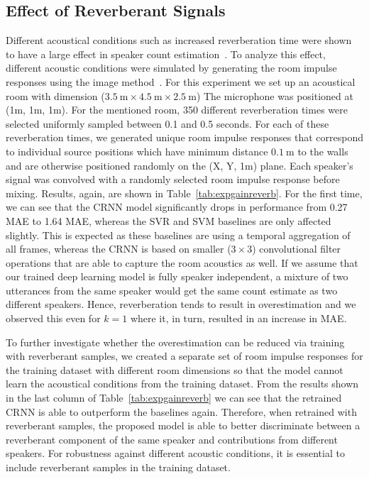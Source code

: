 \subsection{Effect of Reverberant Signals}%
\label{ssec:exp_reverb}
Different acoustical conditions such as increased reverberation time were shown to have a large effect in speaker count estimation~\cite{Pasha17_reverb}.
To analyze this effect, different acoustic conditions were simulated by generating the room impulse responses using the image method~\cite{allen79, habets16}.
For this experiment we set up an acoustical room with dimension ($3.5~\mbox{m} \times 4.5~\mbox{m} \times 2.5~\mbox{m}$)
The microphone was positioned at (1m, 1m, 1m).
For the mentioned room, 350 different reverberation times were selected uniformly sampled between 0.1 and 0.5 seconds.
For each of these reverberation times, we generated unique room impulse responses that correspond to individual source positions which have minimum distance $0.1~\mbox{m}$ to the walls and are otherwise positioned randomly on the (X, Y, 1m) plane.
Each speaker's signal was convolved with a randomly selected room impulse response before mixing.
Results, again, are shown in Table~\ref{tab:expgainreverb}.
For the first time, we can see that the CRNN model significantly drops in performance from 0.27 MAE to 1.64 MAE, whereas the SVR and SVM baselines are only affected slightly.
This is expected as these baselines are using a temporal aggregation of all frames, whereas the CRNN is based on smaller (\(3 \times 3\)) convolutional filter operations that are able to capture the room acoustics as well.
If we assume that our trained deep learning model is fully speaker independent, a mixture of two utterances from the same speaker would get the same count estimate as two different speakers.
Hence, reverberation tends to result in overestimation and we observed this even for \(k = 1\) where it, in turn, resulted in an increase in MAE.
\par
To further investigate whether the overestimation can be reduced via training with reverberant samples, we created a separate set of room impulse responses for the training dataset with different room dimensions so that the model cannot learn the acoustical conditions from the training dataset.
From the results shown in the last column of Table~\ref{tab:expgainreverb} we can see that the retrained CRNN is able to outperform the baselines again.
Therefore, when retrained with reverberant samples, the proposed model is able to better discriminate between a reverberant component of the same speaker and contributions from different speakers.
For robustness against different acoustic conditions, it is essential to include reverberant samples in the training dataset.

